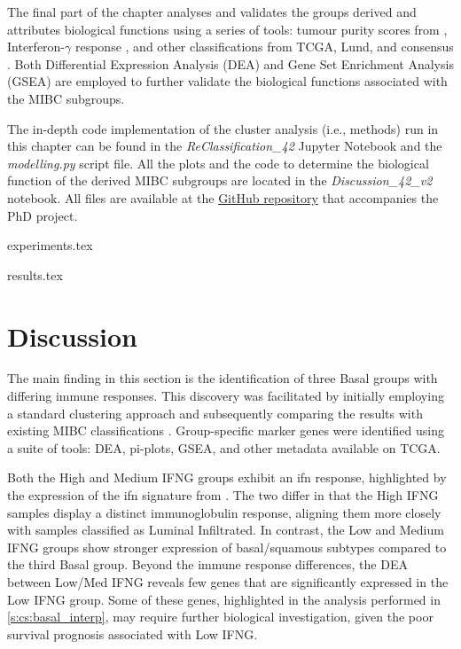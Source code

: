 The final part of the chapter analyses and validates the groups derived and attributes biological functions using a series of tools: tumour purity scores from \citet{Yoshihara2013-wq}, Interferon-$\gamma$ response \citet{Baker2022-bj}, and other classifications from TCGA, Lund, and consensus \citet{Robertson2017-mg,Marzouka2018-ge,Kamoun2020-tj}. Both Differential Expression Analysis (DEA) and Gene Set Enrichment Analysis (GSEA) are employed to further validate the biological functions associated with the MIBC subgroups.

The in-depth code implementation of the cluster analysis (i.e., methods) run in this chapter can be found in the \textit{ReClassification\_42} Jupyter Notebook and the \textit{modelling.py} script file. All the plots and the code to determine the biological function of the derived MIBC subgroups are located in the \textit{Discussion\_42\_v2} notebook. All files are available at the \href{https://github.com/vladUng/Phd_thesis_exp}{GitHub repository} that accompanies the PhD project.



{experiments.tex}

{results.tex}

\section{Discussion}

The main finding in this section is the identification of three Basal groups with differing immune responses. This discovery was facilitated by initially employing a standard clustering approach and subsequently comparing the results with existing MIBC classifications \citet{Baker2022-bj,Marzouka2018-ge}. Group-specific marker genes were identified using a suite of tools: DEA, pi-plots, GSEA, and other metadata available on TCGA.

Both the High and Medium IFNG groups exhibit an \acrshort{ifn} response, highlighted by the expression of the \acrshort{ifn} signature from \citet{Baker2022-bj}. The two differ in that the High IFNG samples display a distinct immunoglobulin response, aligning them more closely with samples classified as Luminal Infiltrated. In contrast, the Low and Medium IFNG groups show stronger expression of basal/squamous subtypes compared to the third Basal group. Beyond the immune response differences, the DEA between Low/Med IFNG reveals few genes that are significantly expressed in the Low IFNG group. Some of these genes, highlighted in the analysis performed in \cref{s:cs:basal_interp}, may require further biological investigation, given the poor survival prognosis associated with Low IFNG.

